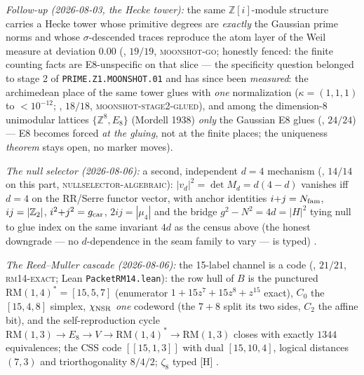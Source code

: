 \emph{Follow-up (2026-08-03, the Hecke tower):} the same
$\mathbb{Z}[i]$-module structure carries a Hecke tower whose
primitive degrees are \emph{exactly} the Gaussian prime norms and
whose $\sigma$-descended traces reproduce the atom layer of the Weil
measure at deviation $0.00$
(, $19/19$,
\textsc{moonshot-go}; honestly fenced: the finite counting facts are
E8-unspecific on that slice --- the specificity question belonged to
stage 2 of \texttt{PRIME.Z1.MOONSHOT.01} and has since been
\emph{measured}: the archimedean place of the same tower glues with
\emph{one} normalization ($\kappa=(1,1,1)$ to $<10^{-12}$;
, $18/18$,
\textsc{moonshot-stage2-glued}), and among the dimension-$8$
unimodular lattices $\{\mathbb{Z}^8,E_8\}$ (Mordell 1938) \emph{only}
the Gaussian E8 glues (,
$24/24$) --- E8 becomes forced \emph{at the gluing}, not at the
finite places; the uniqueness \emph{theorem} stays open, no marker
moves).

\emph{The null selector (2026-08-06):} a second, independent
$d=4$ mechanism
(, $14/14$ on this part,
\textsc{nullselector-algebraic}): $|v_d|^2=\det M_d=d(4-d)$
vanishes iff $d=4$ on the RR/Serre functor vector, with anchor
identities $i{+}j=N_{\mathrm{fam}}$, $ij=|\mathbb{Z}_2|$, $i^2{+}j^2=g_{\mathrm{car}}$,
$2ij=|\mu_4|$ and the bridge $g^2-N^2=4d=|H|^2$ tying null to
glue index on the same invariant $4d$ as the census above (the
honest downgrade --- no $d$-dependence in the seam family to vary
--- is typed) \mE.

\emph{The Reed--Muller cascade (2026-08-06):} the 15-label
channel is a code
(, $21/21$,
\textsc{rm14-exact}; Lean \texttt{PacketRM14.lean}): the row hull
of $B$ is the punctured $\mathrm{RM}(1,4)^*=[15,5,7]$ (enumerator
$1+15z^7+15z^8+z^{15}$ exact), $C_0$ the $[15,4,8]$ simplex,
$\chi_{\rm NSR}$ \emph{one} codeword (the $7{+}8$ split its two
sides, $C_2$ the affine bit), and the self-reproduction cycle
$\mathrm{RM}(1,3)\to E_8\to V\to\mathrm{RM}(1,4)^*\to
\mathrm{RM}(1,3)$ closes with exactly $1344$ equivalences; the
CSS code $[[15,1,3]]$ with dual $[15,10,4]$, logical distances
$(7,3)$ and triorthogonality $8/4/2$; $\zeta_8$ typed [H] \mE.

